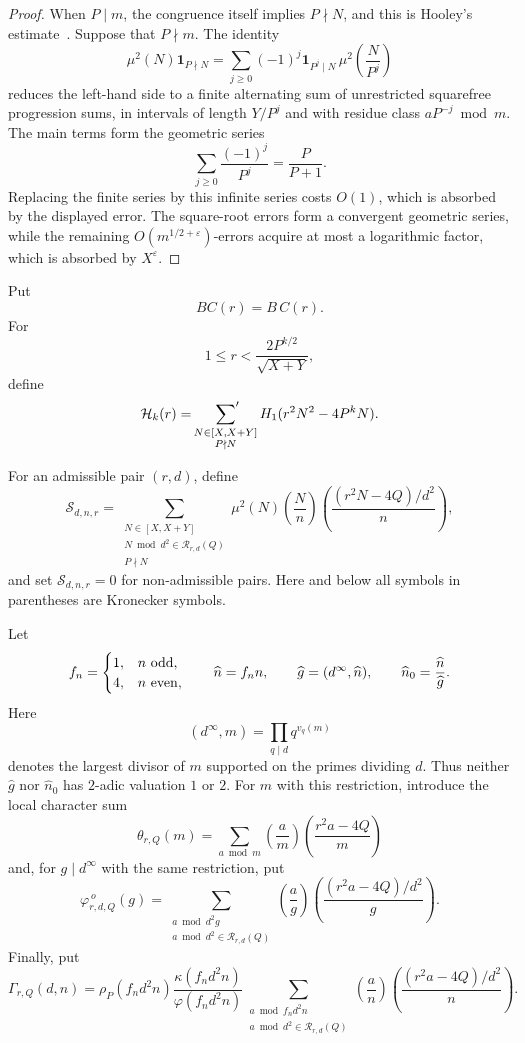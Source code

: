\documentclass[12pt,reqno]{amsart}
\numberwithin{equation}{section}
\theoremstyle{plain}
\theoremstyle{definition}
\theoremstyle{remark}
\begin{document}
\begin{proof}
When $P\mid m$, the congruence itself implies $P\nmid N$, and this is Hooley's estimate~\cite{Hooley1975}.  Suppose that $P\nmid m$.
The identity
\[
\mu^2(N)\mathbf 1_{P\nmid N}
=
\sum_{j\geq0}(-1)^j\mathbf 1_{P^j\mid N}\,
\mu^2\left(\frac{N}{P^j}\right)
\]
reduces the left-hand side to a finite alternating sum of unrestricted squarefree progression sums, in intervals of length $Y/P^j$ and with residue class $aP^{-j}\bmod m$.
The main terms form the geometric series
\[
\sum_{j\geq0}\frac{(-1)^j}{P^j}=\frac{P}{P+1}.
\]
Replacing the finite series by this infinite series costs $O(1)$, which is absorbed by the displayed error.
The square-root errors form a convergent geometric series, while the remaining $O(m^{1/2+\varepsilon})$-errors acquire at most a logarithmic factor, which is absorbed by $X^\varepsilon$.
\end{proof}

Put
\[
BC(r)=B\,C(r).
\]
For
\[
1\leq r<\frac{2P^{k/2}}{\sqrt{X+Y}},
\]
define
\[
\mathcal H_k(r)
=
\sideset{}{'}\sum_{\substack{N\in[X,X+Y]\\P\nmid N}}
H_1(r^2N^2-4P^kN).
\]

For an admissible pair $(r,d)$, define
\[
\mathcal S_{d,n,r}
=
\sum_{\substack{N\in[X,X+Y]\\
N\bmod d^2\in\mathcal R_{r,d}(Q)\\P\nmid N}}
\mu^2(N)
\left(\frac{N}{n}\right)
\left(\frac{(r^2N-4Q)/d^2}{n}\right),
\]
and set $\mathcal S_{d,n,r}=0$ for non-admissible pairs.
Here and below all symbols in parentheses are Kronecker symbols.

Let
\[
f_n=
\begin{cases}
1,&n\ {\rm odd},\\
4,&n\ {\rm even},
\end{cases}
\qquad
\widehat n=f_nn,
\qquad
\widehat g=(d^\infty,\widehat n),
\qquad
\widehat n_0=\frac{\widehat n}{\widehat g}.
\]
Here
\[
(d^\infty,m)=\prod_{q\mid d}q^{v_q(m)}
\]
denotes the largest divisor of $m$ supported on the primes dividing $d$.
Thus neither $\widehat g$ nor $\widehat n_0$ has $2$-adic valuation $1$ or $2$.
For $m$ with this restriction, introduce the local character sum
\[
\theta_{r,Q}(m)
=
\sum_{a\bmod m}
\left(\frac{a}{m}\right)
\left(\frac{r^2a-4Q}{m}\right)
\]
and, for $g\mid d^\infty$ with the same restriction, put
\[
\varphi^{\,o}_{r,d,Q}(g)
=
\sum_{\substack{a\bmod d^2g\\
a\bmod d^2\in\mathcal R_{r,d}(Q)}}
\left(\frac{a}{g}\right)
\left(\frac{(r^2a-4Q)/d^2}{g}\right).
\]
Finally, put
\[
\Gamma_{r,Q}(d,n)
=
\rho_P(f_nd^2n)
\frac{\kappa(f_nd^2n)}{\varphi(f_nd^2n)}
\sum_{\substack{a\bmod f_nd^2n\\
a\bmod d^2\in\mathcal R_{r,d}(Q)}}
\left(\frac a n\right)
\left(\frac{(r^2a-4Q)/d^2}{n}\right).
\]
\end{document}
